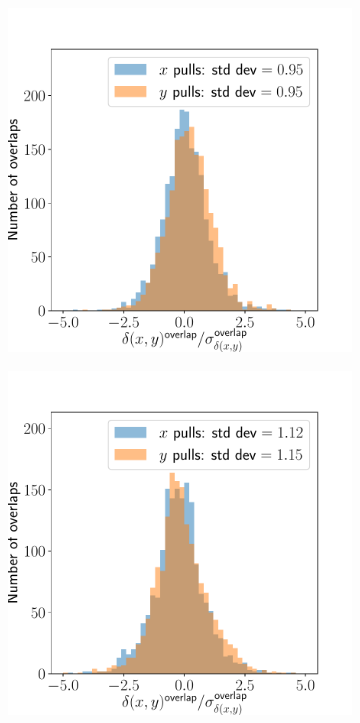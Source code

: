 \documentclass{article}
\begin{document}
\begin{figure}[ht]
\begin{subfigure}{0.24\linewidth}
		\caption{}
		\label{fig:stitchpull32}
	\end{subfigure}
	\begin{subfigure}{0.24\linewidth}
		\includegraphics[width=\linewidth]{stitch-pull-2-2.pdf}
		\caption{}
		\label{fig:stitchpull22}
	\end{subfigure}
	\begin{subfigure}{0.24\linewidth}
		\includegraphics[width=\linewidth]{stitch-pull-1-2.pdf}

\end{subfigure}
\end{figure}
\end{document}
